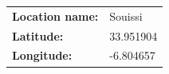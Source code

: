 \documentclass[11pt,a4paper]{article}
\begin{document}
\begin{minipage}{0.45\textwidth}
\begin{table}[H]
\begin{tabular} { p{3cm}p{5cm} }
 \textbf{ Location name: } & 
\cellcolor[HTML]{ FFFFFF } Souissi

\\ 

 \textbf{ Latitude: } & 
\cellcolor[HTML]{ FFFFFF } 33.951904

\\ 

 \textbf{ Longitude: } & 
\cellcolor[HTML]{ FFFFFF } -6.804657

\\ 

\end{tabular}
\end{table}
\end{minipage}
\end{document}
